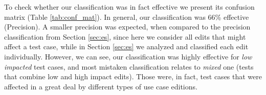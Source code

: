 To check whether our classification was in fact effective we present its confusion matrix (Table \ref{tab:conf_mat}). In general, our classification was 66\% effective (Precision). A smaller precision was expected, when compared to the precision classification from Section \ref{sec:es}, since here we consider all edits that might affect a test case, while in Section \ref{sec:es} we analyzed and classified each edit individually. However, we can see, our classification was highly effective for \textit{low impacted} test cases, and most mistaken classification relates to \textit{mixed} one (tests that combine low and high impact edits). Those were, in fact, test cases that were affected in a great deal by different types of use case editions.


